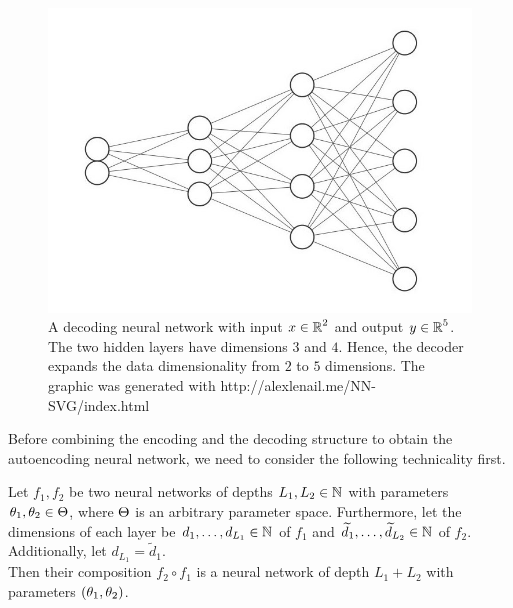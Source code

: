 \begin{figure}
\begin{center}
   \begin{minipage}[b]{0.9\linewidth}
      \includegraphics[width=\linewidth]{decoder}
      \caption{A decoding neural network with input $x\in \operatorname{\mathbb{R}}^2$ and output $y \in \operatorname{\mathbb{R}}^5$. The two hidden layers have dimensions $3$ and $4$. Hence, the decoder expands the data dimensionality from $2$ to $5$ dimensions. The graphic was generated with http://alexlenail.me/NN-SVG/index.html}\label{img_decoder}
	\end{minipage}
\end{center}
\end{figure}

Before combining the encoding and the decoding structure to obtain the autoencoding neural network, we need to consider the following technicality first.

\begin{lemma}\label{lemma:composition_of_nns}
Let $f_1, f_2$ be two neural networks of depths $L_1, L_2 \in \operatorname{\mathbb{N}}$ with parameters $\theta_1, \theta_2 \in \operatorname{\Theta}$, where $\operatorname{\Theta}$ is an arbitrary parameter space. Furthermore, let the dimensions of each layer be $d_1, \ldots, d_{L_1} \in \operatorname{\mathbb{N}}$ of $f_1$ and $\widetilde{d}_1, \ldots, \widetilde{d}_{L_2} \in \operatorname{\mathbb{N}}$ of $f_2$. Additionally, let $d_{L_1} = \tilde{d}_1$.\\
Then their composition $f_2\circ f_1$ is a neural network of depth $L_1 + L_2$ with parameters $(\theta_1, \theta_2)$.
\end{lemma}

